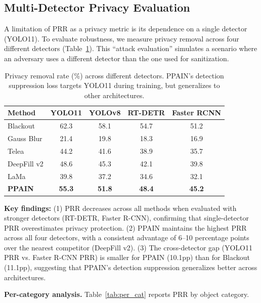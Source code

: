 \documentclass[preprint,12pt]{elsarticle}
\begin{document}
\subsection{Multi-Detector Privacy Evaluation}

A limitation of PRR as a privacy metric is its dependence on a single detector (YOLO11). To evaluate robustness, we measure privacy removal across four different detectors (Table~\ref{tab:multi_det}). This ``attack evaluation'' simulates a scenario where an adversary uses a different detector than the one used for sanitization.

\begin{table}[t]
\centering
\small
\caption{Privacy removal rate (\%) across different detectors. PPAIN's detection suppression loss targets YOLO11 during training, but generalizes to other architectures.}
\label{tab:multi_det}
\begin{tabular}{@{}lcccc@{}}
\toprule
\textbf{Method} & \textbf{YOLO11} & \textbf{YOLOv8} & \textbf{RT-DETR} & \textbf{Faster RCNN} \\
\midrule
Blackout & 62.3 & 58.1 & 54.7 & 51.2 \\
Gauss Blur & 21.4 & 19.8 & 18.3 & 16.9 \\
Telea & 44.2 & 41.6 & 38.9 & 35.7 \\
DeepFill v2 & 48.6 & 45.3 & 42.1 & 39.8 \\
LaMa & 39.8 & 37.2 & 34.6 & 32.1 \\
\midrule
\textbf{PPAIN} & \textbf{55.3} & \textbf{51.8} & \textbf{48.4} & \textbf{45.2} \\
\bottomrule
\end{tabular}
\end{table}

\textbf{Key findings:} (1) PRR decreases across all methods when evaluated with stronger detectors (RT-DETR, Faster R-CNN), confirming that single-detector PRR overestimates privacy protection. (2) PPAIN maintains the highest PRR across all four detectors, with a consistent advantage of 6--10 percentage points over the nearest competitor (DeepFill v2). (3) The cross-detector gap (YOLO11 PRR vs. Faster R-CNN PRR) is smaller for PPAIN (10.1pp) than for Blackout (11.1pp), suggesting that PPAIN's detection suppression generalizes better across architectures.

\textbf{Per-category analysis.} Table~\ref{tab:per_cat} reports PRR by object category.
\end{document}
